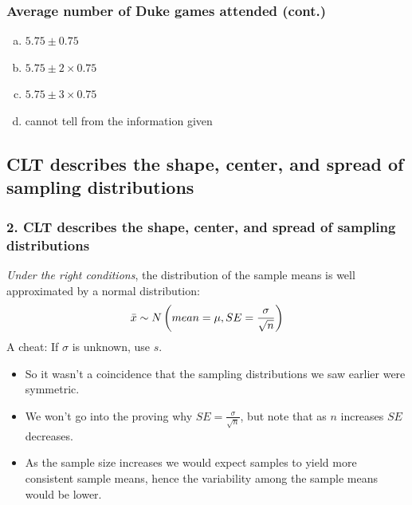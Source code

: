 \documentclass[11pt,containsverbatim,handout,xcolor=xelatex,dvipsnames,table]{beamer}
\newcommand{\solnMult}[1]{#1}
\newcommand{\soln}[1]{}
\begin{document}

\begin{frame}[fragile]
\frametitle{Average number of Duke games attended (cont.)}


\begin{enumerate}[(a)]
\item $5.75 \pm 0.75$
\item \solnMult{$5.75 \pm 2 \times 0.75$} \soln{\only<2>{\red{$\rightarrow (4.25,7.25)$}}}
\item $5.75 \pm 3 \times 0.75$
\item cannot tell from the information given
\end{enumerate}

\end{frame}


\subsection{CLT describes the shape, center, and spread of sampling distributions}
\label{mi2}


\begin{frame}
\frametitle{2. CLT describes the shape, center, and spread of sampling distributions}

\emph{Under the right conditions}, the distribution of the sample means is well
approximated by a normal distribution:
\[ \bar{x} \sim N \left(  mean = \mu, SE = \frac{\sigma}{\sqrt{n}}  \right) \]
A cheat: If $\sigma$ is unknown, use $s$.

\pause

\begin{itemize}

\item So it wasn't a coincidence that the sampling distributions we saw earlier were symmetric.

\item We won't go into the proving why $SE =  \frac{\sigma}{\sqrt{n}}$, but note that as $n$ increases $SE$ decreases. 

\item As the sample size increases we would expect samples to yield more consistent sample means, hence the variability among the sample means would be lower.

\end{itemize}

\end{frame}
\end{document}
